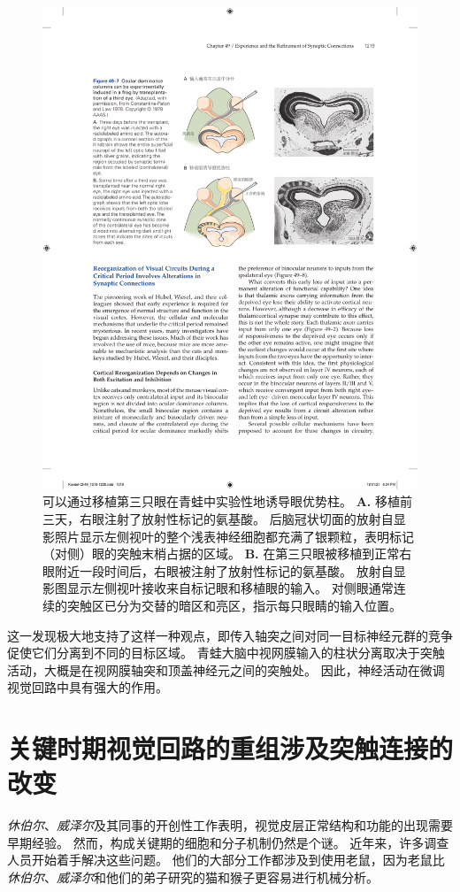 \begin{figure}[htbp]
	\centering
	\includegraphics[width=0.79\linewidth]{chap49/fig_49_7}
	\caption{可以通过移植第三只眼在青蛙中实验性地诱导眼优势柱\cite{constantine1978eye}。
		\textbf{A.} 移植前三天，右眼注射了放射性标记的氨基酸。
		后脑冠状切面的放射自显影照片显示左侧视叶的整个浅表神经细胞都充满了银颗粒，表明标记（对侧）眼的突触末梢占据的区域。
		\textbf{B.} 在第三只眼被移植到正常右眼附近一段时间后，右眼被注射了放射性标记的氨基酸。
		放射自显影图显示左侧视叶接收来自标记眼和移植眼的输入。
		对侧眼通常连续的突触区已分为交替的暗区和亮区，指示每只眼睛的输入位置。}
	\label{fig:49_7}
\end{figure}


这一发现极大地支持了这样一种观点，即传入轴突之间对同一目标神经元群的竞争促使它们分离到不同的目标区域。
青蛙大脑中视网膜输入的柱状分离取决于突触活动，大概是在视网膜轴突和顶盖神经元之间的突触处。
因此，神经活动在微调视觉回路中具有强大的作用。



\section{关键时期视觉回路的重组涉及突触连接的改变}

\textit{休伯尔}、\textit{威泽尔}及其同事的开创性工作表明，视觉皮层正常结构和功能的出现需要早期经验。
然而，构成关键期的细胞和分子机制仍然是个谜。
近年来，许多调查人员开始着手解决这些问题。
他们的大部分工作都涉及到使用老鼠，因为老鼠比\textit{休伯尔}、\textit{威泽尔}和他们的弟子研究的猫和猴子更容易进行机械分析。


